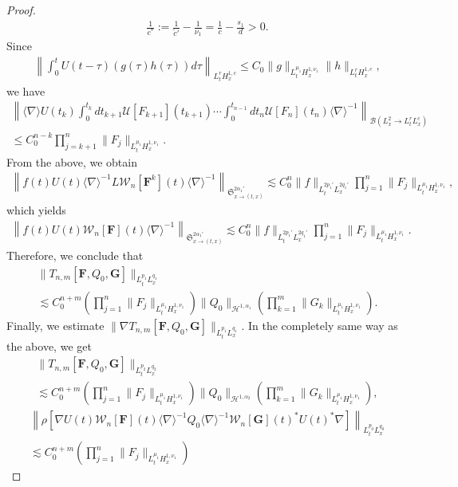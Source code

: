 \documentclass[10pt,a4paper]{amsart}
\providecommand{\No}[1]{\left\| #1 \right\|}
\newcommand{\vF}{{\mathbf{F}}}
\newcommand{\vG}{{\mathbf{G}}}
\newcommand{\CB}{\mathcal{B}}
\newcommand{\CH}{\mathcal{H}}
\newcommand{\CU}{\mathcal{U}}
\newcommand{\CW}{\mathcal{W}}
\newcommand{\FS}{\mathfrak{S}}
\newcommand{\al}{\alpha}
\newcommand{\ta}{\tau}
\newcommand{\rh}{\rho}
\newcommand{\wt}{\widetilde}
\newcommand{\Dk}[1]{\left[#1\right]}
\newcommand{\K}[1]{\left(#1\right)}
\renewcommand{\No}[1]{\left\| #1 \right\|}
\newcommand{\sd}{\langle \nabla \rangle}
\newcommand{\sdi}{\sd^{-1}}
\newcommand{\tx}{{t,x}}
\newcommand{\na}{\nabla}
\newcommand{\ls}{\lesssim}
\begin{document}
\begin{proof}
\begin{align}
\frac{1}{c^*}:=\frac{1}{\wt{c}'}-\frac{1}{\nu_1} = \frac{1}{c}-\frac{s_1}{d} > 0.
\end{align}
Since
\begin{align}
\No{
\int_0^t U(t-\ta)(g(\ta)h(\ta)) d\ta }_{L^r_t H^{1,c}_x}
\le C_0 \|g\|_{L^{\mu_1}_t H^{1,\nu_1}_x} \|h\|_{L^r_t H^{1,c}_x},
\end{align}
we have
\begin{multline}
\No{
\sd U(t_k)
\int_0^{t_k}dt_{k+1} \CU[F_{k+1}](t_{k+1})
\cdots
\int_0^{t_{n-1}} dt_n \CU[F_n](t_n) \sdi }_{\CB\left(L^2_x \to L^r_t L^c_x\right)} \\
\le C_0^{n-k}
\prod_{j=k+1}^n \|F_j\|_{L^{\mu_1}_t H^{1,\nu_1}_x}.
\end{multline}
From the above, we obtain
\begin{align}
\left\|f(t) U(t) \sdi L \CW_n[\vF^k](t) \sd^{-1}\right\|_{\FS^{2\al_1'}_{x \to (\tx)}}
\ls C_0^n \|f\|_{L^{2p_1'}_t L^{2q_1'}_x}\prod_{j=1}^n \|F_j\|_{L^{\mu_1}_t H^{1,\nu_1}_x},
\end{align}
which yields
\begin{align}\label{half}
\left\|f(t)U(t)\CW_n[\vF](t) \sd^{-1} \right\|_{\FS^{2\al_1'}_{x \to (\tx)}}
\ls C_0^n \|f\|_{L^{2p_1'}_t L^{2q_1'}_x}\prod_{j=1}^n \|F_j\|_{L^{\mu_1}_t H^{1,\nu_1}_x}.
\end{align}
Therefore, we conclude that
\begin{multline}
\|T_{n,m}[\vF,Q_0,\vG]\|_{L^{p_1}_t L^{q_1}_x}
\\
\ls C_0^{n+m} \K{\prod_{j=1}^n
\|F_j\|_{L^{\mu_1}_t H^{1,\nu_1}_x}}
\|Q_0\|_{\CH^{1,\al_1}}
\K{\prod_{k=1}^m \|G_k\|_{L^{\mu_1}_t H^{1,\nu_1}_x}}.
\end{multline}
Finally, we estimate $\|\na T_{n,m}[\vF,Q_0,\vG]\|_{L^{p_1}_t L^{q_1}_x}$. In the completely same way as the above, we get
\begin{multline}\label{End H1}
\|T_{n,m} [\vF,Q_0,\vG]\|_{L^{p_2}_t L^{q_2}_x}\\
\ls C_0^{n+m}
\K{\prod_{j=1}^n \|F_j\|_{L^{\mu_1}_t H^{1,\nu_1}_x}}
\|Q_0\|_{\CH^{1,\al_2}}
\K{\prod_{k=1}^ m\|G_k\|_{L^{\mu_1}_t H^{1,\nu_1}_x}}, 
\end{multline}
\begin{multline}\label{deriv L2}
\left\|\rh\Dk{\na U(t)\CW_n[\vF](t) \sdi Q_0 \sdi \CW_n[\vG](t)^* U(t)^* \na} \right\|_{L^{p_0}_t L^{q_0}_x} \\
\ls C_0^{n+m} \K{\prod_{j=1}^n \|F_j\|_{L^{\mu_1}_t H^{1,\nu_1}_x}}

\end{multline}
\end{proof}
\end{document}
